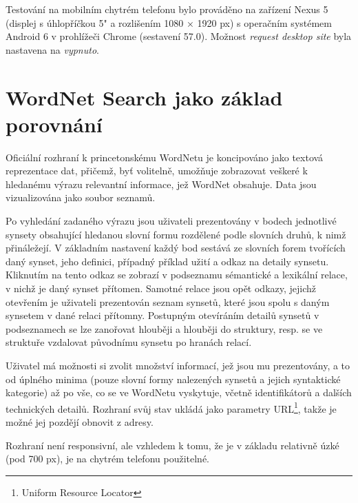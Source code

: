 \documentclass[a4paper, 11pt, oneside]{book}
\begin{document}
				Testování na mobilním chytrém telefonu bylo prováděno na zařízení Nexus 5 (displej s úhlopříčkou 5" a rozlišením 1080 × 1920 px) s operačním systémem Android 6 v prohlížeči Chrome (sestavení 57.0). Možnost \textit{request desktop site} byla nastavena na \textit{vypnuto}.

			\section{WordNet Search jako základ porovnání}
			\label{wnvis:wnsearch}

				Oficiální rozhraní k princetonskému WordNetu je koncipováno jako textová reprezentace dat, přičemž, byť volitelně, umožňuje zobrazovat veškeré k hledanému výrazu relevantní informace, jež WordNet obsahuje. Data jsou vizualizována jako soubor seznamů.

				Po vyhledání zadaného výrazu jsou uživateli prezentovány v bodech jednotlivé synsety obsahující hledanou slovní formu rozdělené podle slovních druhů, k nimž přináležejí. V základním nastavení každý bod sestává ze slovních forem tvořících daný synset, jeho definici, případný příklad užití a odkaz na detaily synsetu. Kliknutím na tento odkaz se zobrazí v podseznamu sémantické a lexikální relace, v nichž je daný synset přítomen. Samotné relace jsou opět odkazy, jejichž otevřením je uživateli prezentován seznam synsetů, které jsou spolu s daným synsetem v dané relaci přítomny. Postupným otevíráním detailů synsetů v podseznamech se lze zanořovat hlouběji a hlouběji do struktury, resp. se ve struktuře vzdalovat původnímu synsetu po hranách relací.

				Uživatel má možnosti si zvolit množství informací, jež jsou mu prezentovány, a to od úplného minima (pouze slovní formy nalezených synsetů a jejich syntaktické kategorie) až po vše, co se ve WordNetu vyskytuje, včetně identifikátorů a dalších technických detailů. Rozhraní svůj stav ukládá jako parametry URL\footnote{Uniform Resource Locator}, takže je možné jej pozdějí obnovit z adresy.

				Rozhraní není responsivní, ale vzhledem k tomu, že je v základu relativně úzké (pod 700 px), je na chytrém telefonu použitelné.
\end{document}

